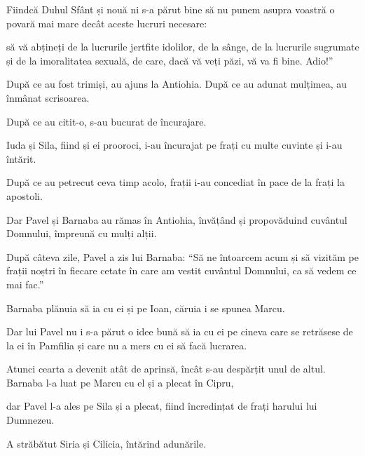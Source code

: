 {Fiindcă Duhul Sfânt și nouă ni s-a părut bine să nu punem asupra voastră o povară mai mare decât aceste lucruri necesare:

să vă abțineți de la lucrurile jertfite idolilor, de la sânge, de la lucrurile sugrumate și de la imoralitatea sexuală, de care, dacă vă veți păzi, vă va fi bine. Adio!”


\par }{\PP {}După ce au fost trimiși, au ajuns la Antiohia. După ce au adunat mulțimea, au înmânat scrisoarea.

După ce au citit-o, s-au bucurat de încurajare.

Iuda și Sila, fiind și ei prooroci, i-au încurajat pe frați cu multe cuvinte și i-au întărit.

După ce au petrecut ceva timp acolo, frații i-au concediat în pace de la frați la apostoli.


Dar Pavel și Barnaba au rămas în Antiohia, învățând și propovăduind cuvântul Domnului, împreună cu mulți alții.


\par }{\PP {}După câteva zile, Pavel a zis lui Barnaba: “Să ne întoarcem acum și să vizităm pe frații noștri în fiecare cetate în care am vestit cuvântul Domnului, ca să vedem ce mai fac.”

Barnaba plănuia să ia cu ei și pe Ioan, căruia i se spunea Marcu.

Dar lui Pavel nu i s-a părut o idee bună să ia cu ei pe cineva care se retrăsese de la ei în Pamfilia și care nu a mers cu ei să facă lucrarea.

Atunci cearta a devenit atât de aprinsă, încât s-au despărțit unul de altul. Barnaba l-a luat pe Marcu cu el și a plecat în Cipru,

dar Pavel l-a ales pe Sila și a plecat, fiind încredințat de frați harului lui Dumnezeu.

A străbătut Siria și Cilicia, întărind adunările.



\par }
